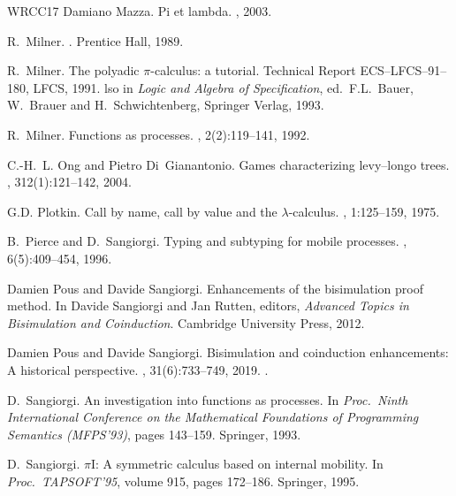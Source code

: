 \documentclass[11pt,a4paper]{amsart}
\theoremstyle{plain}
\theoremstyle{definition}
\theoremstyle{defC}
\theoremstyle{thmC}
\theoremstyle{plain}
\numberwithin{equation}{section}
\theoremstyle{plain}
\theoremstyle{definition}
\begin{document}
\begin{thebibliography}{WRCC17}
Damiano Mazza.
\newblock Pi et lambda.
, 2003.

R.~Milner.
.
\newblock Prentice Hall, 1989.

R.~Milner.
\newblock The polyadic $\pi$-calculus: a tutorial.
\newblock Technical Report {ECS--LFCS--91--180}, LFCS, 1991.
lso in {\em Logic and Algebra of Specification}, ed.\ F.L.\ Bauer,
  W.\ Brauer and H.\ Schwichtenberg, Springer Verlag, 1993.

R.~Milner.
\newblock Functions as processes.
, 2(2):119--141, 1992.

C.-H.~L. Ong and Pietro Di~Gianantonio.
\newblock Games characterizing levy--longo trees.
, 312(1):121--142, 2004.

G.D. Plotkin.
\newblock Call by name, call by value and the $\lambda$-calculus.
, 1:125--159, 1975.

B.~Pierce and D.~Sangiorgi.
\newblock Typing and subtyping for mobile processes.
, 6(5):409--454, 1996.

Damien Pous and Davide Sangiorgi.
\newblock Enhancements of the bisimulation proof method.
\newblock In Davide Sangiorgi and Jan Rutten, editors, {\em Advanced Topics in
  Bisimulation and Coinduction}. Cambridge University Press, 2012.

Damien Pous and Davide Sangiorgi.
\newblock Bisimulation and coinduction enhancements: {A} historical
  perspective.
, 31(6):733--749, 2019.
\newblock \href {https://doi.org/10.1007/s00165-019-00497-w}
  {}.

D.~Sangiorgi.
\newblock An investigation into functions as processes.
\newblock In {\em Proc.\ Ninth International Conference on the {M}athematical
  {F}oundations of {P}rogramming {S}emantics ({MFPS}'93)}, pages 143--159.
  Springer, 1993.

D.~Sangiorgi.
\newblock $\pi${I}: A symmetric calculus based on internal mobility.
\newblock In {\em Proc.\ {TAPSOFT'95}}, volume 915, pages 172--186. Springer,
  1995.


\end{thebibliography}
\end{document}
